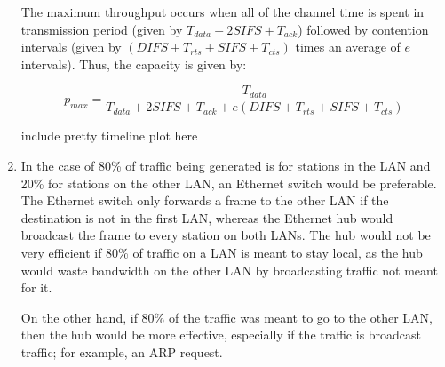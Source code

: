 \documentclass{article}
\begin{document}
\begin{enumerate}
The maximum throughput occurs when all of the channel time is spent in transmission period (given by $ T_{data} + 2SIFS + T_{ack} $) followed by contention intervals (given by $ (DIFS + T_{rts} + SIFS + T_{cts}) $ times an average of $ e $ intervals). Thus, the capacity is given by:

$$ p_{max} = \frac{T_{data}}{T_{data} + 2SIFS + T_{ack} + e(DIFS + T_{rts} + SIFS + T_{cts})} $$

include pretty timeline plot here

\item In the case of 80\% of traffic being generated is for stations in the LAN and 20\% for stations on the other LAN, an Ethernet switch would be preferable. The Ethernet switch only forwards a frame to the other LAN if the destination is not in the first LAN, whereas the Ethernet hub would broadcast the frame to every station on both LANs. The hub would not be very efficient if 80\% of traffic on a LAN is meant to stay local, as the hub would waste bandwidth on the other LAN by broadcasting traffic not meant for it.

On the other hand, if 80\% of the traffic was meant to go to the other LAN, then the hub would be more effective, especially if the traffic is broadcast traffic; for example, an ARP request.

\end{enumerate}
\end{document}
